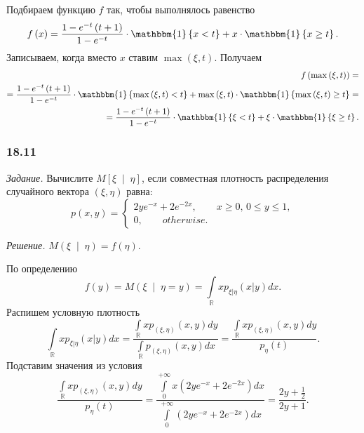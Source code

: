 \begin{enumerate}[label=\alph*)]
  Подбираем функцию $f$ так, чтобы выполнялось равенство
  $$f \left( x \right) =
    \frac{1 - e^{-t} \left( t + 1 \right) }{1 - e^{-t}} \cdot \mathbbm{1} \left\{ x < t \right\} +
    x \cdot \mathbbm{1} \left\{ x \geq t \right\}.$$
  Записываем, когда вместо $x$ ставим $ \max \left( \xi, t \right) $.
  Получаем
  \begin{equation*}
    \begin{split}
      f \left( \max \left( \xi, t \right) \right) = \\
      = \frac{1 - e^{-t} \left( t + 1 \right) }{1 - e^{-t}} \cdot
      \mathbbm{1} \left\{ \max \left( \xi, t \right) < t \right\} +
      \max \left( \xi, t \right) \cdot
      \mathbbm{1} \left\{ \max \left( \xi, t \right) \geq t \right\} = \\
      = \frac{1 - e^{-t} \left( t + 1 \right) }{1 - e^{-t}} \cdot
      \mathbbm{1} \left\{ \xi < t \right\} +
      \xi \cdot \mathbbm{1} \left\{ \xi \geq t \right\}.
    \end{split}
  \end{equation*}
\end{enumerate}

\subsubsection*{18.11}

\textit{Задание.}
Вычислите $M \left[ \xi \; \middle| \; \eta \right] $,
если совместная плотность распределения случайного вектора $ \left( \xi, \eta \right) $ равна:
$$p \left( x, y \right) =
  \begin{cases}
    2ye^{-x} + 2e^{-2x}, \qquad x \geq 0, \, 0 \leq y \leq 1, \\
    0, \qquad otherwise.
  \end{cases}$$

\textit{Решение.} $M \left( \xi \; \middle| \; \eta \right) = f \left( \eta \right) $.

По определению
$$f \left( y \right) =
  M \left( \xi \; \middle| \; \eta = y \right) =
  \int \limits_{ \mathbb{R}} xp_{ \left. \xi \right| \eta } \left( \left. x \right| y \right) dx.$$
Распишем условную плотность
$$ \int \limits_{ \mathbb{R}} xp_{ \left. \xi \right| \eta } \left( \left. x \right| y \right) dx =
  \frac{ \int \limits_{ \mathbb{R}} xp_{ \left( \xi, \eta \right) } \left( x, y \right) dy}{ \int \limits_{ \mathbb{R}} p_{ \left( \xi, \eta \right) } \left( x, y \right) dx} =
  \frac{ \int \limits_{ \mathbb{R}} xp_{ \left( \xi, \eta \right) } \left( x, y \right) dy}{p_{ \eta } \left( t \right) }.$$
Подставим значения из условия
$$ \frac{ \int \limits_{ \mathbb{R}} xp_{ \left( \xi, \eta \right) } \left( x, y \right) dy}{p_{ \eta } \left( t \right) } =
  \frac{ \int \limits_0^{+ \infty } x \left( 2ye^{-x} + 2e^{-2x} \right) dx}{ \int \limits_0^{+ \infty } \left( 2ye^{-x} + 2e^{-2x} \right) dx} =
  \frac{2y + \frac{1}{2}}{2y + 1}.$$

